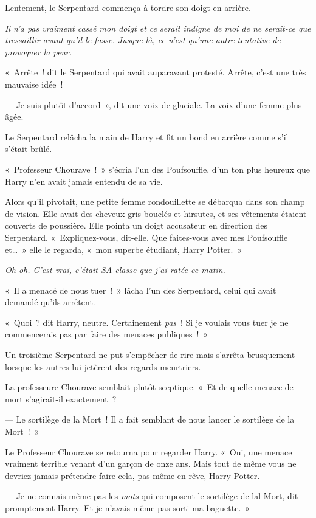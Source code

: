 Lentement, le Serpentard commença à tordre son doigt en arrière.

\emph{Il n'a pas vraiment cassé mon doigt et ce serait indigne de moi de ne serait-ce que tressaillir avant qu'il le fasse.
Jusque-là, ce n'est qu'une autre tentative de provoquer la peur.}

«~Arrête~! dit le Serpentard qui avait auparavant protesté. Arrête, c'est une très mauvaise idée~!

--- Je suis plutôt d'accord~», dit une voix de glaciale. La voix d'une femme plus âgée.

Le Serpentard relâcha la main de Harry et fit un bond en arrière comme s'il s'était brûlé.

«~Professeur Chourave~!~» s'écria l'un des Poufsouffle, d'un ton plus heureux que Harry n'en avait jamais entendu de sa vie.

Alors qu'il pivotait, une petite femme rondouillette se débarqua dans son champ de vision.
Elle avait des cheveux gris bouclés et hirsutes, et ses vêtements étaient couverts de poussière.
Elle pointa un doigt accusateur en direction des Serpentard.
«~Expliquez-vous, dit-elle.
Que faites-vous avec mes Poufsouffle et…~» elle le regarda, «~mon superbe étudiant, Harry Potter.~»

\emph{Oh oh. C'est vrai, c'était SA classe que j'ai ratée ce matin.}

«~Il a menacé de nous tuer~!~» lâcha l'un des Serpentard, celui qui avait demandé qu'ils arrêtent.

«~Quoi~? dit Harry, neutre.
Certainement \emph{pas}~!
Si je voulais vous tuer je ne commencerais pas par faire des menaces publiques~!~»

Un troisième Serpentard ne put s'empêcher de rire mais s'arrêta brusquement lorsque les autres lui jetèrent des regards meurtriers.

La professeure Chourave semblait plutôt sceptique.
«~Et de quelle menace de mort s'agirait-il exactement~?

--- Le sortilège de la Mort~! Il a fait semblant de nous lancer le sortilège de la Mort~!~»

Le Professeur Chourave se retourna pour regarder Harry.
«~Oui, une menace vraiment terrible venant d'un garçon de onze ans.
Mais tout de même vous ne devriez jamais prétendre faire cela, pas même en rêve, Harry Potter.

--- Je ne connais même pas les \emph{mots} qui composent le sortilège de lal Mort, dit promptement Harry. Et je n'avais même pas sorti ma baguette.~»

